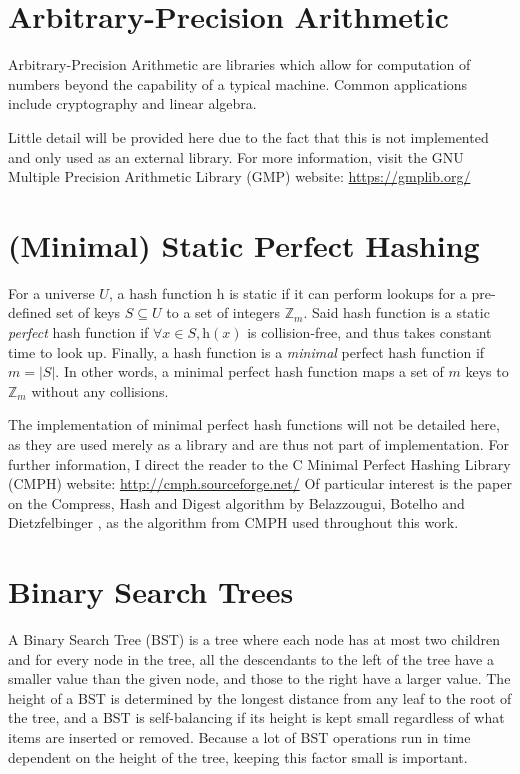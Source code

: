 \documentclass[ %
                    author={Dominic Joseph Moylett},
                    degree={MEng},
                     title={Dictionary Matching with Fingerprints},
                  subtitle={An Empirical Analysis},
                      type={research},
                      year={2015} ]{dissertation}
\begin{document}
\section{Arbitrary-Precision Arithmetic}

Arbitrary-Precision Arithmetic are libraries which allow for computation of numbers beyond the capability of a typical machine. Common applications include cryptography and linear algebra.

Little detail will be provided here due to the fact that this is not implemented and only used as an external library. For more information, visit the GNU Multiple Precision Arithmetic Library (GMP) website: \url{https://gmplib.org/}

\section{(Minimal) Static Perfect Hashing}
\label{min-perf-hash}

For a universe $U$, a hash function $\text{h}$ is static if it can perform lookups for a pre-defined set of keys $S \subseteq U$ to a set of integers $\mathbb{Z}_m$. Said hash function is a static \textit{perfect} hash function if $\forall x \in S, \text{h}(x)$ is collision-free, and thus takes constant time to look up. Finally, a hash function is a \textit{minimal} perfect hash function if $m = |S|$. In other words, a minimal perfect hash function maps a set of $m$ keys to $\mathbb{Z}_m$ without any collisions.

The implementation of minimal perfect hash functions will not be detailed here, as they are used merely as a library and are thus not part of implementation. For further information, I direct the reader to the C Minimal Perfect Hashing Library (CMPH) website: \url{http://cmph.sourceforge.net/} Of particular interest is the paper on the Compress, Hash and Digest algorithm by Belazzougui, Botelho and Dietzfelbinger \cite{belazzougui:chd}, as the algorithm from CMPH used throughout this work.

\section{Binary Search Trees}
A Binary Search Tree (BST) \cite[pp 286-298]{clrs} is a tree where each node has at most two children and for every node in the tree, all the descendants to the left of the tree have a smaller value than the given node, and those to the right have a larger value. The height of a BST is determined by the longest distance from any leaf to the root of the tree, and a BST is self-balancing if its height is kept small regardless of what items are inserted or removed. Because a lot of BST operations run in time dependent on the height of the tree, keeping this factor small is important.
\end{document}
